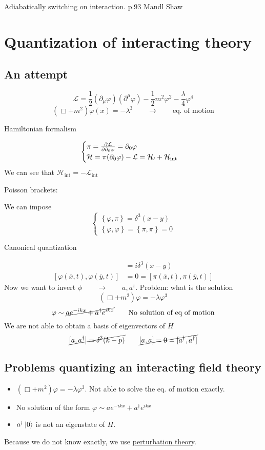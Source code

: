 Adiabatically switching on interaction. p.93 Mandl Shaw

\section{Quantization of interacting theory}
\subsection{An attempt}
\begin{example}
\[\mathcal{L}  = \frac{1}{2}\left(\partial_\mu\varphi\right)\left(\partial^\mu\varphi\right) - \frac{1}{2}m^2\varphi^2 - \frac{\lambda}{4}\varphi^4\]
\[ \left(\Box + m^2\right)\varphi(x) = - \lambda^3 \qquad \to \qquad\text{eq. of motion} \]

Hamiltonian formalism

\[ \begin{cases}
\pi =  \frac{\partial{^{}}\mathcal{L} }{\partial{{\partial_0\varphi}^{}}}  = \partial_0 \varphi \\
\mathcal{H} = \pi(\partial_0\varphi)-\mathcal{L} = \mathcal{H_0} + \mathcal{H}_\text{int}
\end{cases} \]
We can see that $\mathcal{H}_\text{int} = -\mathcal{L}_\text{int}$

Poisson brackets:

We can impose
\[ \begin{cases}
\left\{\varphi, \pi\right\} = \delta^3(x-y) \\
\left\{\varphi, \varphi\right\} = \left\{\pi,\pi\right\} = 0
\end{cases} \]

Canonical quantization

\begin{align*}
[\varphi(\overline{x},t), \pi(\overline{y},t)] &= i\delta^3(\overline{x}- \overline{y}) \\
[\varphi(\overline{x},t), \varphi(\overline{y},t)] &= 0 = [\pi(\overline{x},t), \pi(\overline{y},t)]
\end{align*}
Now we want to invert $\phi \qquad \to \qquad a,a^\dagger$.
Problem: what is the solution
\[ \boxed{\left(\Box+m^2\right)\varphi = -\lambda\varphi^3} \]
\[ \varphi \sim \cancel{ae^{-ikx} + a^\dagger e^{ikx}} \qquad \text{No solution of eq of motion} \]
We are not able to obtain a basis of eigenvectors of $H$
\[ \cancel{[a,a^\dagger] = \delta^3(k-p)} \qquad \cancel{[ a,a] = 0 = [a^\dagger, a^\dagger]} \]
\end{example}


\subsection{Problems quantizing an interacting field theory}
\begin{itemize}
\item $\left(\Box + m^2\right)\varphi = -\lambda\varphi^3$. Not able to solve the eq. of motion exactly.
\item No solution of the form $\varphi \sim ae^{-ikx}+a^\dagger e^{ikx}$
\item $a^\dagger\left| 0 \right\rangle$ is not an eigenstate of $H$.
\end{itemize}
Because we do not know exactly, we use \underline{perturbation theory}.

